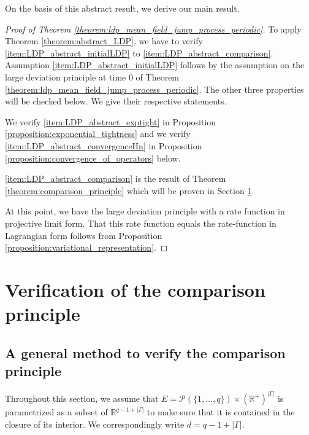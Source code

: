 \documentclass[a4paper]{article}
\newcommand{\cP}{\mathcal{P}}
\newcommand{\bR}{\mathbb{R}}
\numberwithin{equation}{section}
\theoremstyle{definition}
\begin{document}
On the basis of this abstract result, we derive our main result.

\begin{proof}[Proof of Theorem \ref{theorem:ldp_mean_field_jump_process_periodic}]
	To apply Theorem \ref{theorem:abstract_LDP}, we have to verify \ref{item:LDP_abstract_initialLDP} to \ref{item:LDP_abstract_comparison}. Assumption \ref{item:LDP_abstract_initialLDP} follows by the assumption on the large deviation principle at time $0$ of Theorem \ref{theorem:ldp_mean_field_jump_process_periodic}. The other three properties will be checked below. We give their respective statements.
	
	\smallskip
	
	We verify \ref{item:LDP_abstract_exptight} in Proposition \ref{proposition:exponential_tightness} and we verify \ref{item:LDP_abstract_convergenceHn} in Proposition \ref{proposition:convergence_of_operators} below.
	
	\ref{item:LDP_abstract_comparison} is the result of Theorem \ref{theorem:comparison_principle} which will be proven in Section \ref{section:proofs_comparison}.
	
	\smallskip
	
	At this point, we have the large deviation principle with a rate function in projective limit form. That this rate function equals the rate-function in Lagrangian form follows from Proposition \ref{proposition:variational_representation}.
\end{proof}









\section{Verification of the comparison principle} \label{section:proofs_comparison}


\subsection{A general method to verify the comparison principle} \label{section:general_method_for_comparison_principle} 

Throughout this section, we assume that $E = \cP(\{1,\dots,q\}) \times (\bR^+)^{|\Gamma|}$ is parametrized as a subset of $\bR^{q-1 + |\Gamma|}$ to make sure that it is contained in the closure of its interior. We correspondingly write $d = q-1 + |\Gamma|$. 
\end{document}
